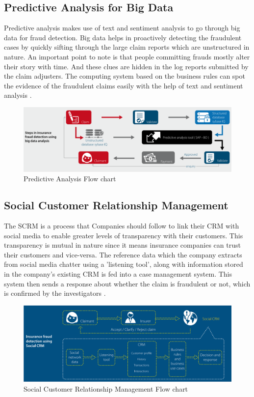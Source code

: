 \documentclass[sigconf]{acmart}
\begin{document}
\subsection{Predictive Analysis for Big Data}
Predictive analysis makes use of text and sentiment analysis to go through big data for fraud detection. Big data helps in proactively detecting the fraudulent cases by quickly sifting through the large claim reports which are unstructured in nature. An important point to note is that people committing frauds mostly alter their story with time. And these clues are hidden in the log reports submitted by the claim adjusters. The computing system based on the business rules can spot the evidence of the fraudulent claims easily with the help of text and sentiment analysis \cite{link7}.
\begin{figure}
  \includegraphics[width=\linewidth]{images/predictive_image1.png}
  \caption{Predictive Analysis Flow chart}
  \label{Figure 2: Predictive Analysis flowchart}
\end{figure}
\subsection{Social Customer Relationship Management}
The SCRM is a process that Companies should follow to link their CRM with social media to enable greater levels of transparency with their customers. This transparency is mutual in nature since it means insurance companies can trust their customers and vice-versa. The reference data which the company extracts from social media chatter using a 'listening tool', along with information stored in the company's existing CRM is fed into a case management system. This system then sends a response about whether the claim is fraudulent or not, which is confirmed by the investigators \cite{link7}.

\begin{figure}
  \includegraphics[width=\linewidth]{images/SCRM_image1.png}
  \caption{Social Customer Relationship Management Flow chart}
  \label{Figure 3:Social Customer Relationship Management Flow chart}
\end{figure}
\end{document}
